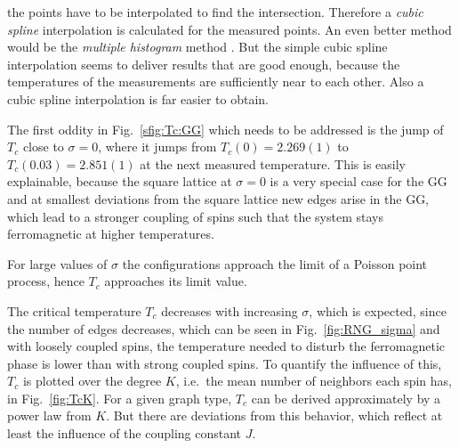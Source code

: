 the points have to be interpolated to find the intersection. Therefore
a \emph{cubic spline} \cite{press2007numerical} interpolation %
is calculated for the measured points.
An even better method would be the
\emph{multiple histogram} method \cite[p. 219ff]{NewmanBarkema1999}.
But the simple cubic spline interpolation seems to deliver results that
are good enough, because the temperatures of the measurements are
sufficiently near to each other. Also a cubic spline interpolation is
far easier to obtain.

The first oddity in Fig.~\ref{sfig:Tc:GG} which needs to be addressed is
the jump of $T_c$ close to $\sigma = 0$, where it jumps from $T_c(0) = 2.269(1)$
to $T_c(0.03) = 2.851(1)$ at the next measured temperature. This is easily explainable,
because the square lattice at $\sigma = 0$ is a very special case for the
GG and at smallest deviations from the square lattice new edges arise in
the GG, which lead to a stronger coupling of spins such that the system stays
ferromagnetic at higher temperatures.

For large values of $\sigma$ the configurations approach the limit of a
Poisson point process, hence $T_c$ approaches its limit value.

The critical temperature $T_c$ decreases with increasing $\sigma$, which
is expected, since the number of edges decreases, which can be seen in
Fig.~\ref{fig:RNG_sigma} and with loosely coupled spins, the temperature
needed to disturb the ferromagnetic phase is lower than with strong coupled
spins. To quantify the influence of this, $T_c$ is plotted over the
degree $K$, i.e.~the mean number of neighbors each spin has, in Fig.~\ref{fig:TcK}.
For a given graph type, $T_c$ can be derived approximately by a power law
from $K$. But there are deviations from this behavior, which reflect
at least the influence of the coupling constant $J$.
